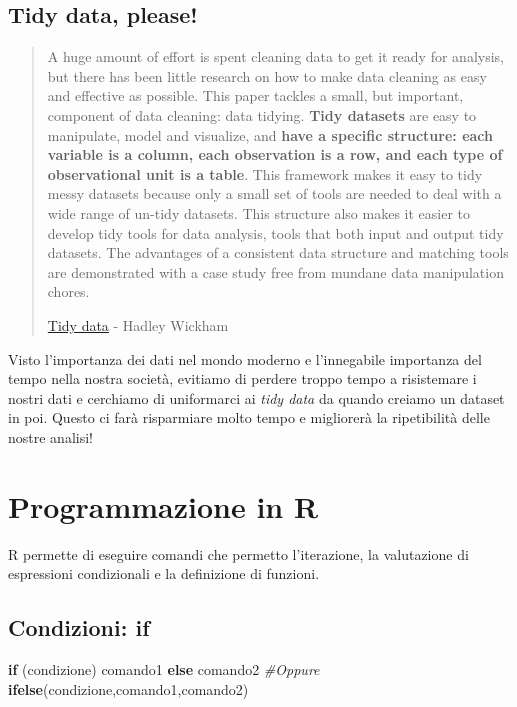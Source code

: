 \documentclass[]{book}
\newenvironment{Shaded}{\begin{snugshade}}{\end{snugshade}}
\newcommand{\CommentTok}[1]{\textcolor[rgb]{0.56,0.35,0.01}{\textit{#1}}}
\newcommand{\ControlFlowTok}[1]{\textcolor[rgb]{0.13,0.29,0.53}{\textbf{#1}}}
\newcommand{\KeywordTok}[1]{\textcolor[rgb]{0.13,0.29,0.53}{\textbf{#1}}}
\newcommand{\NormalTok}[1]{#1}
\begin{document}
\hypertarget{tidy-data-please}{%
\subsection{Tidy data, please!}\label{tidy-data-please}}

\begin{quote}
A huge amount of effort is spent cleaning data to get it ready for
analysis, but there has been little research on how to make data cleaning as easy and effective as possible. This paper tackles a small, but important, component of data cleaning: data tidying. \textbf{Tidy datasets} are easy to manipulate, model and visualize, and \textbf{have a specific structure: each variable is a column, each observation is a row, and each type of observational unit is a table}. This framework makes it easy to tidy messy datasets because only a small set of tools are needed to deal with a wide range of un-tidy datasets. This structure also makes it easier to develop tidy tools for data analysis, tools that both input and output tidy datasets. The advantages of a consistent data structure and matching tools are demonstrated with a case study free from mundane data manipulation chores.

 \href{https://www.jstatsoft.org/article/view/v059i10}{Tidy data} - Hadley Wickham
\end{quote}

Visto l'importanza dei dati nel mondo moderno e l'innegabile importanza del tempo nella nostra società, evitiamo di perdere troppo tempo a risistemare i nostri dati e cerchiamo di uniformarci ai \emph{tidy data} da quando creiamo un dataset in poi. Questo ci farà risparmiare molto tempo e migliorerà la ripetibilità delle nostre analisi!

\hypertarget{programmazione-in-r}{%
\section{Programmazione in R}\label{programmazione-in-r}}

R permette di eseguire comandi che permetto l'iterazione, la valutazione di espressioni condizionali e la definizione di funzioni.

\hypertarget{condizioni-if}{%
\subsection{Condizioni: if}\label{condizioni-if}}

\begin{Shaded}
\begin{Highlighting}[]
\ControlFlowTok{if}\NormalTok{ (condizione) comando1 }\ControlFlowTok{else}\NormalTok{ comando2}
\CommentTok{#Oppure}
\KeywordTok{ifelse}\NormalTok{(condizione,comando1,comando2)}
\end{Highlighting}
\end{Shaded}
\end{document}
